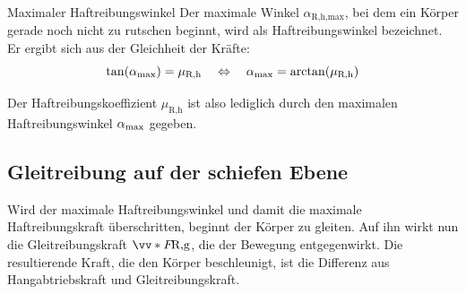 \begin{rememberbox}[]{Maximaler Haftreibungswinkel}
Der maximale Winkel $\alpha_{\text{R,h,max}}$, bei dem ein Körper gerade noch nicht zu rutschen beginnt, wird als Haftreibungswinkel bezeichnet. Er ergibt sich aus der Gleichheit der Kräfte:
\begin{equation}
    \tan(\alpha_{\mathrm{max}}) = \mu_{\text{R,h}} \quad \Leftrightarrow \quad \alpha_{\mathrm{max}} = \arctan(\mu_{\text{R,h}})
\end{equation}
\end{rememberbox}
Der Haftreibungskoeffizient $\mu_{\text{R,h}}$ ist also lediglich durch den maximalen Haftreibungswinkel $\alpha_{\mathrm{max}}$ gegeben. 

\subsection{Gleitreibung auf der schiefen Ebene}\label{subsec: gleiten_auf_der_schiefen_ebene}
Wird der maximale Haftreibungswinkel und damit die maximale Haftreibungskraft überschritten, beginnt der Körper zu gleiten. Auf ihn wirkt nun die Gleitreibungskraft $\ivecS{F}{\text{R,g}}$, die der Bewegung entgegenwirkt. Die resultierende Kraft, die den Körper beschleunigt, ist die Differenz aus Hangabtriebskraft und Gleitreibungskraft.
